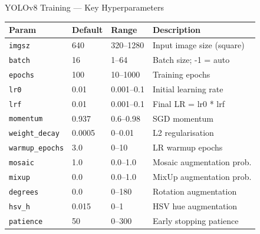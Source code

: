 \documentclass[aspectratio=169]{beamer}
\begin{document}
\begin{frame}{YOLOv8 Training — Key Hyperparameters}
  \begin{center}
  \footnotesize
  \begin{tabular}{lllp{5cm}}
    \toprule
    \textbf{Param} & \textbf{Default} & \textbf{Range} & \textbf{Description}\\
    \midrule
    \texttt{imgsz}   & 640    & 320--1280  & Input image size (square)\\
    \texttt{batch}   & 16     & 1--64      & Batch size; -1 = auto\\
    \texttt{epochs}  & 100    & 10--1000   & Training epochs\\
    \texttt{lr0}     & 0.01   & 0.001--0.1 & Initial learning rate\\
    \texttt{lrf}     & 0.01   & 0.001--0.1 & Final LR = lr0 * lrf\\
    \texttt{momentum}& 0.937  & 0.6--0.98  & SGD momentum\\
    \texttt{weight\_decay} & 0.0005 & 0--0.01 & L2 regularisation\\
    \texttt{warmup\_epochs} & 3.0 & 0--10  & LR warmup epochs\\
    \texttt{mosaic}  & 1.0    & 0.0--1.0   & Mosaic augmentation prob.\\
    \texttt{mixup}   & 0.0    & 0.0--1.0   & MixUp augmentation prob.\\
    \texttt{degrees} & 0.0    & 0--180     & Rotation augmentation\\
    \texttt{hsv\_h}  & 0.015  & 0--1       & HSV hue augmentation\\
    \texttt{patience}& 50     & 0--300     & Early stopping patience\\
    \bottomrule
  \end{tabular}
  \end{center}
\end{frame}
\end{document}
